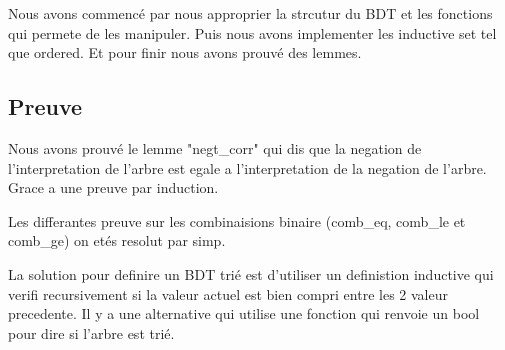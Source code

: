 \documentclass{article}
\begin{document}
Nous avons commencé par nous approprier la strcutur du BDT et les fonctions qui permete de les manipuler. Puis nous avons implementer les inductive set tel que
ordered. Et pour finir nous avons prouvé des lemmes.

\subsection{Preuve}

Nous avons prouvé le lemme "negt\_corr" qui dis que la negation de
l'interpretation de l'arbre est egale a l'interpretation de la negation de
l'arbre. Grace a une preuve par induction.

Les differantes preuve sur les combinaisions binaire (comb\_eq, comb\_le et
comb\_ge) on etés resolut par simp.

La solution pour definire un BDT trié est d'utiliser un definistion
inductive qui verifi recursivement si la valeur actuel est bien compri
entre les 2 valeur precedente.
Il y a une alternative qui utilise une fonction qui renvoie un bool pour
dire si l'arbre est trié.
\end{document}
